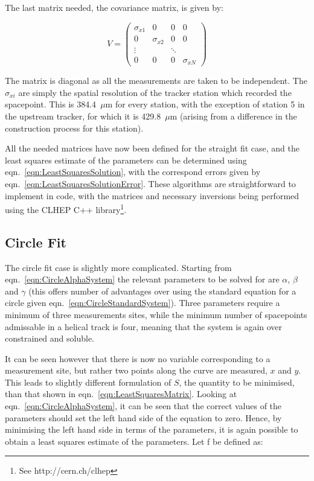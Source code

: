 \noindent
The last matrix needed, the covariance matrix, is given by:

\begin{equation}
  V =
  \begin{pmatrix}
    \sigma_{x1} & 0 & 0 & 0 \\
    0 & \sigma_{x2} & 0 & 0 \\
    \vdots & & \ddots & \\
    0 & 0 & 0 & \sigma_{xN}
  \end{pmatrix}
\end{equation}

\noindent
The matrix is diagonal as all the measurements are taken to be independent. The $\sigma_{xi}$ are simply the spatial resolution of the tracker station which recorded the spacepoint. This is 384.4~$\mu$m for every station, with the exception of station 5 in the upstream tracker, for which it is 429.8~$\mu$m (arising from a difference in the construction process for this station). 

All the needed matrices have now been defined for the straight fit case, and the least squares estimate of the parameters can be determined using eqn.~\ref{eqn:LeastSquaresSolution}, with the correspond errors given by eqn.~\ref{eqn:LeastSquaresSolutionError}. These algorithms are straightforward to implement in code, with the matrices and necessary inversions being performed using the CLHEP C++ library\footnote{See http://cern.ch/clhep}.

\subsection{Circle Fit}
The circle fit case is slightly more complicated. Starting from eqn.~\ref{eqn:CircleAlphaSystem} the relevant parameters to be solved for are $\alpha$, $\beta$ and $\gamma$ (this offers number of advantages over using the standard equation for a circle given eqn.~\ref{eqn:CircleStandardSystem}).  Three parameters require a minimum of three measurements sites, while the minimum number of spacepoints admissable in a helical track is four, meaning that the system is again over constrained and soluble. 

It can be seen however that there is now no variable corresponding to a measurement site, but rather two points along the curve are measured, $x$ and $y$.  This leads to slightly different formulation of $S$, the quantity to be minimised, than that shown in eqn.~\ref{eqn:LeastSquaresMatrix}. Looking at eqn.~\ref{eqn:CircleAlphaSystem}, it can be seen that the correct values of the parameters should set the left hand side of the equation to zero. Hence, by minimising the left hand side in terms of the parameters, it is again possible to obtain a least squares estimate of the parameters.  Let f be defined as:

